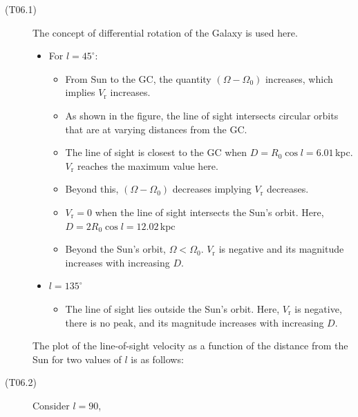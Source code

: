 \begin{description}
\item[(T06.1)]
  The concept of differential rotation of the Galaxy is used here.
  \begin{itemize}
  \item For $l = 45^\circ$:
    \begin{itemize}
    \item From Sun to the GC, the quantity $(\Omega - \Omega_0)$ increases,
      which implies $V_{\mathrm{r}}$ increases.
    \item As shown in the figure, the line of sight intersects circular orbits
      that are at varying distances from the GC.
    \item The line of sight is closest to the GC when
      $D = R_0\cos l = 6.01$\,kpc. $V_{\mathrm{r}}$ reaches the maximum value
      here.
    \item Beyond this, $(\Omega - \Omega_0)$ decreases implying
      $V_{\mathrm{r}}$ decreases.
    \item $V_{\mathrm{r}} = 0$ when the line of sight intersects the Sun's
      orbit. Here, $D = 2R_0\cos l = 12.02$\,kpc
    \item Beyond the Sun's orbit, $\Omega < \Omega_0$. $V_{\mathrm{r}}$ is
      negative and its magnitude increases with increasing $D$.
    \end{itemize}
  \item $l = 135^\circ$
    \begin{itemize}
    \item The line of sight lies outside the Sun's orbit. Here,
      $V_{\mathrm{r}}$ is negative, there is no peak, and its magnitude
      increases with increasing $D$.
    \end{itemize}
  \end{itemize}
  The plot of the line-of-sight velocity as a function of the distance from
  the Sun for two values of $l$ is as follows:
\item[(T06.2)] Consider $l = 90$,

\end{description}
